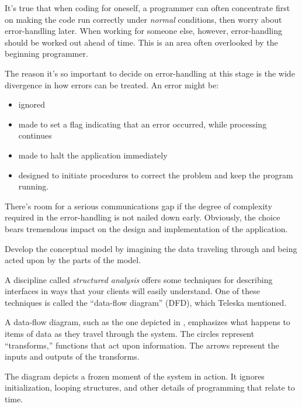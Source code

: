 \noindent It's true that when coding for oneself, a programmer can
often concentrate first on making the code run correctly under
\emph{normal} conditions, then worry about error-handling later. When
working for someone else, however, error-handling should be worked out
ahead of time. This is an area often overlooked by the beginning
programmer.

The reason it's so important to decide on error-handling at this stage
is the wide divergence in how errors can be treated. An error might be:

\begin{itemize}
\item ignored
\item made to set a flag indicating that an error occurred, while processing
continues
\item made to halt the application immediately
\item designed to initiate procedures to correct the problem and keep the
program running.
\end{itemize}


There's room for a serious communications gap if the degree of
complexity required in the error-handling is not nailed down early. Obviously, the
choice bears tremendous impact on the design and implementation of the
application.

\begin{tip}
Develop the conceptual model by imagining the data traveling through and
being acted upon by the parts of the model.
\end{tip}
A discipline called \emph{structured analysis} \cite{weinberg80} offers some
techniques for describing interfaces in ways that your clients will
easily understand.  One of these techniques is called the ``data-flow
diagram'' (DFD), which Teleska mentioned.


A data-flow diagram, such as the one depicted in ,
emphasizes what happens to items of data as they travel through the
system.  The circles represent ``transforms,'' functions that act upon
information.  The arrows represent the inputs and outputs of the
transforms.

The diagram depicts a frozen moment of the system in action. It
ignores initialization, looping structures, and other details of
programming that relate to time.

